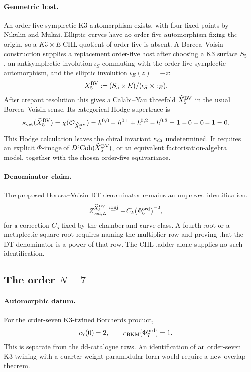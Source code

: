 \paragraph{Geometric host.}
An order-five symplectic K3 automorphism exists, with four fixed points
by Nikulin and Mukai.  Elliptic curves have no order-five automorphism
fixing the origin, so a \(K3\times E\) CHL quotient of order five is
absent.  A Borcea--Voisin construction supplies a replacement
order-five host after choosing a K3 surface \(S_5\), an antisymplectic
involution \(\iota_S\) commuting with the order-five symplectic
automorphism, and the elliptic involution \(\iota_E(z)=-z\):
\[
  X_5^{\mathrm{BV}}:=(S_5\times E)/(\iota_S\times\iota_E).
\]
After crepant resolution this gives a Calabi--Yau threefold
\(\widehat X_5^{\mathrm{BV}}\) in the usual Borcea--Voisin sense.  Its
categorical Hodge supertrace is
\[
  \kappa_{\mathrm{cat}}(\widehat X_5^{\mathrm{BV}})
  =\chi(\mathcal{O}_{\widehat X_5^{\mathrm{BV}}})
  =h^{0,0}-h^{0,1}+h^{0,2}-h^{0,3}=1-0+0-1=0.
\]
This Hodge calculation leaves the chiral invariant \(\kappa_{\mathrm{ch}}\)
undetermined.  It requires an explicit \(\Phi\)-image of
\(D^b\mathrm{Coh}(\widehat X_5^{\mathrm{BV}})\), or an equivalent
factorisation-algebra model, together with the chosen order-five
equivariance.

\paragraph{Denominator claim.}
The proposed Borcea--Voisin DT denominator remains an unproved
identification:
\[
  Z^{\widehat X_5^{\mathrm{BV}}}_{\mathrm{red},L}
  \stackrel{\mathrm{conj}}{=}
  -\,C_5\bigl(\Phi_5^{\mathrm{ord}}\bigr)^{-2},
\]
for a correction \(C_5\) fixed by the chamber and curve class.  A fourth
root or a metaplectic square root requires naming the
multiplier row and proving that the DT denominator is a power of that
row.  The CHL ladder alone supplies no such identification.

\subsection*{The order \(N=7\)}

\paragraph{Automorphic datum.}
For the order-seven K3-twined Borcherds product,
\[
  c_7(0)=2,\qquad \kappa_{\mathrm{BKM}}(\Phi_7^{\mathrm{ord}})=1.
\]
This is separate from the dd-catalogue rows.  An identification of an
order-seven K3 twining with a quarter-weight paramodular form would
require a new overlap theorem.

